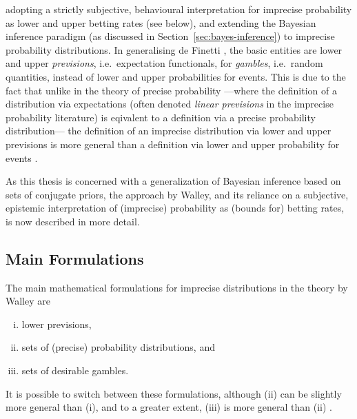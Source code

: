 \begin{enumerate}[(i)]
adopting a strictly subjective, behavioural interpretation for imprecise probability
as lower and upper betting rates (see below),
and extending the Bayesian inference paradigm (as discussed in Section~\ref{sec:bayes-inference})
to imprecise probability distributions.
In generalising de Finetti \parencite*{1937:finetti,1970:finetti}, the basic entities are lower and upper \emph{previsions},
i.e.\ expectation functionals, for \emph{gambles}, i.e.\ random quantities,
instead of lower and upper probabilities for events.
This is due to the fact that unlike in the theory of precise probability%
---where the definition of a distribution via expectations %
(often denoted \emph{linear previsions} in the imprecise probability literature)
is eqivalent to a definition via a precise probability distribution---%
the definition of an imprecise distribution via lower and upper previsions
is more general than a definition via lower and upper probability for events
\parencite[p.~132]{2000:walley::towards}.
\end{enumerate}
As this thesis is concerned with a generalization of Bayesian inference
based on sets of conjugate priors, the approach by Walley,
and its reliance on a subjective, epistemic interpretation of (imprecise) probability
as (bounds for) betting rates, is now described in more detail.


\subsection{Main Formulations}
\label{sec:ip-main}


The main mathematical formulations for imprecise distributions
in the theory by Walley \parencite*{1991:walley, 2000:walley::towards}
are
\begin{enumerate}[(i)]
\item lower previsions,
\item sets of (precise) probability distributions, and
\item sets of desirable gambles.
\end{enumerate}
It is possible to switch between these formulations,
although (ii) can be slightly more general than (i),
and to a greater extent, (iii) is more general than (ii) \parencite{2000:walley::towards}.

